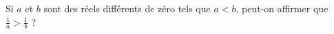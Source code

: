 
\begin{exercice}\label{exosmath-0260}

    Si \( a\) et \( b\) sont des réels différents de zéro tels que \( a<b\), peut-on affirmer que \( \frac{1}{ a }>\frac{1}{ b }\) ?

\end{exercice}
